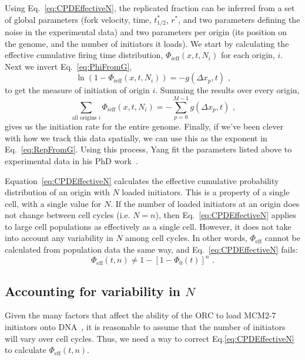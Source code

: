 {		Using Eq.~\ref{eq:CPDEffectiveN}, the replicated fraction can be inferred from a set of global parameters (fork velocity, time, $t^*_{1/2}$, $r^*$, and two parameters defining the noise in the experimental data) and two parameters per origin (its position on the genome, and the number of initiators it loads).
		We start by calculating the effective cumulative firing time distribution, $\Phi_{i\text{eff}}(x,t,N_i)$ for each origin, $i$.
		Next we invert Eq.~\ref{eq:PhiFromG},
		\begin{equation}
			\ln \left( 1- \Phi_{i\text{eff}}(x,t,N_i)\right) = - g(\Delta x_p, t) \text{ ,}
		\end{equation}
		to get the measure of initiation of origin $i$.
		Summing the results over every origin,
		\begin{equation}
			\sum\limits_{\text{all origins }i}\Phi_{i\text{eff}}(x,t,N_i) = - \sum\limits_{p=0}^{M-1} g(\Delta x_p,t) \text{ ,}
		\end{equation}
		gives us the initiation rate for the entire genome.
		Finally, if we've been clever with how we track this data spatially, we can use this as the exponent in Eq.~\ref{eq:RepFromG}.
		Using this process, Yang fit the parameters listed above to experimental data in his PhD work~\cite{ScottsThesis}.
	
		Equation~\ref{eq:CPDEffectiveN} calculates the effective cumulative probability distribution of an origin with $N$ loaded initiators.
		This is a property of a single cell, with a single value for $N$.
		If the number of loaded initiators at an origin does not change between cell cycles (i.e. $N=n$), then Eq.~\ref{eq:CPDEffectiveN} applies to large cell populations as effectively as a single cell.
		However, it does not take into account any variability in $N$ among cell cycles.
		In other words, $\Phi_{\text{eff}}$ cannot be calculated from population data the same way, and Eq.~\ref{eq:CPDEffectiveN} fails:
		\begin{equation} \label{eq:CPDEffectivenTemp}
			\Phi_{\text{eff}}(t,n) \neq 1 - \left[1 - \Phi_0(t)\right]^n\text{ .}
		\end{equation}
		
		
		\subsection{Accounting for variability in $N$}
		\label{subsec:VariableN}
		
		Given the many factors that affect the ability of the ORC to load MCM2-7 initiators onto DNA~\cite{MultiMCM}, it is reasonable to assume that the number of initiators will vary over cell cycles.
		Thus, we need a way to correct Eq.\ref{eq:CPDEffectiveN} to calculate $\Phi_\text{eff}(t,n)$.
		
}
